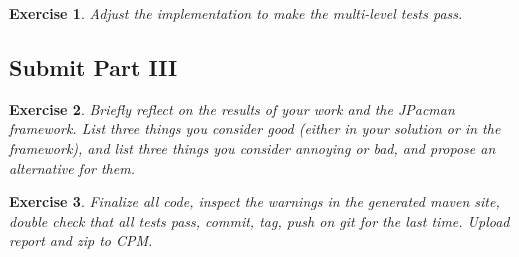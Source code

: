 \documentclass[a4paper]{article}
\newtheorem{thm}{Exercise}
\begin{document}
    \begin{thm}
      Adjust the implementation to make the multi-level tests pass.
    \end{thm}
    
  \subsection{Submit Part III}
    \begin{thm}
      Briefly reflect on the results of your work and the JPacman framework.
      List three things you consider good (either in your solution or in the framework),
      and list three things you consider annoying or bad, and propose an alternative for them.
    \end{thm}
  
    \begin{thm}
      Finalize all code, inspect the warnings in the generated maven site, double check
      that all tests pass, commit, tag, push on git for the last time. Upload report and zip to CPM.
    \end{thm}
\end{document}
